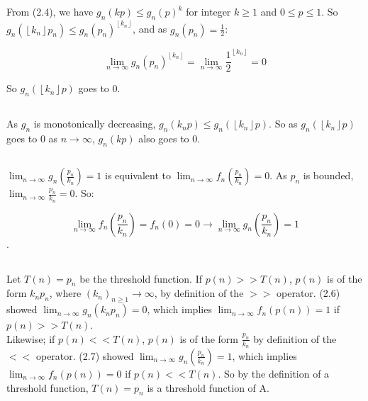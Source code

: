 \documentclass{article}
\begin{document}
\subsection{}
From (2.4), we have $g_n(kp) \le g_n(p)^k$ for integer $k \ge 1$ and $0 \le p \le 1$. So $g_n(\left \lfloor{k_n}\right \rfloor p_n) \le g_n(p_n)^{\left \lfloor{k_n}\right \rfloor}$, and as $g_n(p_n) = \frac{1}{2}$: 

$$\lim_{n\to\infty} g_n(p_n)^{\left \lfloor{k_n}\right \rfloor} = \lim_{n\to\infty} \frac{1}{2}^{\left \lfloor{k_n}\right \rfloor} = 0$$

So $g_n(\left \lfloor{k_n}\right \rfloor p)$ goes to 0.

\subsection{}
As $g_n$ is monotonically decreasing, $g_n(k_n p) \le g_n(\left \lfloor{k_n}\right \rfloor p)$. So as $g_n(\left \lfloor{k_n}\right \rfloor p)$ goes to 0 as $n \to \infty$, $g_n(kp)$ also goes to 0.

\subsection{}
$\lim_{n\to\infty} g_n(\frac{p_n}{k_n}) = 1$ is equivalent to $\lim_{n\to\infty} f_n\left(\frac{p_n}{k_n}\right)=0$. As $p_n$ is bounded, $\lim_{n\to\infty} \frac{p_n}{k_n} = 0$. So:

$$\lim_{n\to\infty} f_n\left(\frac{p_n}{k_n}\right) = f_n(0) = 0 \rightarrow \lim_{n\to\infty} g_n\left(\frac{p_n}{k_n}\right) = 1$$.

\subsection{}
Let $T(n) = p_n$ be the threshold function. If $p(n) >> T(n)$, $p(n)$ is of the form $k_n p_n$, where $(k_n)_{n \ge 1} \to \infty$, by definition of the $>>$ operator. (2.6) showed $\lim_{n\to\infty} g_n(k_n p_n) = 0$, which implies $\lim_{n\to\infty} f_n(p(n)) = 1$ if $p(n) >> T(n)$.\\

Likewise; if $p(n) << T(n)$, $p(n)$ is of the form $\frac{p_n}{k_n}$ by definition of the $<<$ operator. (2.7) showed $\lim_{n\to\infty} g_n(\frac{p_n}{k_n}) = 1$, which implies $\lim_{n\to\infty} f_n(p(n)) = 0$ if $p(n) << T(n)$. So by the definition of a threshold function, $T(n) = p_n$ is a threshold function of A.
\end{document}

